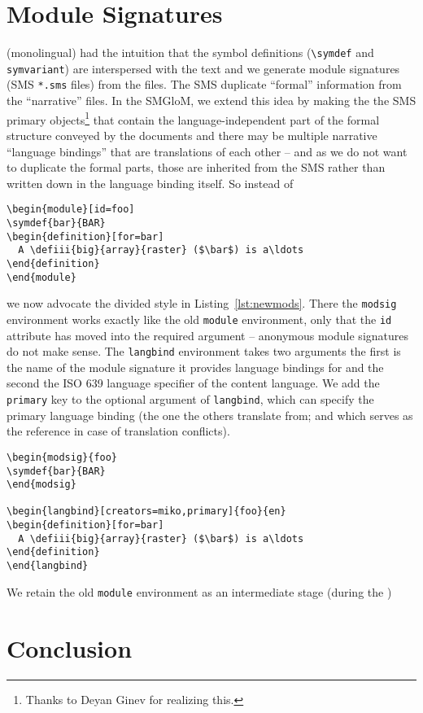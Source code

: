 \documentclass{bluenote}
\def\smglom{\textsf{SMGloM}\xspace}
\begin{document}
\section{\protect\sTeX Module Signatures}

(monolingual) \sTeX had the intuition that the symbol definitions (\lstinline|\symdef| and
\lstinline|symvariant|) are interspersed with the text and we generate \sTeX module
signatures (SMS \lstinline|*.sms| files) from the \sTeX files. The SMS duplicate
``formal'' information from the ``narrative'' \sTeX files. In the \smglom, we extend this
idea by making the the SMS primary objects\footnote{Thanks to Deyan Ginev for realizing
  this.} that contain the language-independent part of the formal structure conveyed by
the \sTeX documents and there may be multiple narrative ``language bindings'' that are
translations of each other -- and as we do not want to duplicate the formal parts, those
are inherited from the SMS rather than written down in the language binding itself. So instead of 
\begin{lstlisting}[caption=Old-Style \protect\sTeX,label=lst:oldmods]
\begin{module}[id=foo]
\symdef{bar}{BAR}
\begin{definition}[for=bar]
  A \defiii{big}{array}{raster} ($\bar$) is a\ldots
\end{definition}
\end{module}
\end{lstlisting}

we now advocate the divided style in Listing~\ref{lst:newmods}. There the \lstinline|modsig| environment works exactly like the old
\lstinline|module| environment, only that the \lstinline|id| attribute has moved into the
required argument -- anonymous module signatures do not make sense. The
\lstinline|langbind| environment takes two arguments the first is the name of the module
signature it provides language bindings for and the second the ISO 639 language specifier
of the content language. We add the \lstinline|primary| key to the optional argument of
\lstinline|langbind|, which can specify the primary language binding (the one the others
translate from; and which serves as the reference in case of translation conflicts).

\begin{lstlisting}[caption=New-Style \protect\sTeX,label=lst:newmods]
\begin{modsig}{foo}
\symdef{bar}{BAR}
\end{modsig}

\begin{langbind}[creators=miko,primary]{foo}{en}
\begin{definition}[for=bar]
  A \defiii{big}{array}{raster} ($\bar$) is a\ldots
\end{definition}
\end{langbind}
\end{lstlisting}
We retain the old \lstinline|module| environment as an intermediate stage (during the ) 

\section{Conclusion}
\printbibliography
\end{document}
